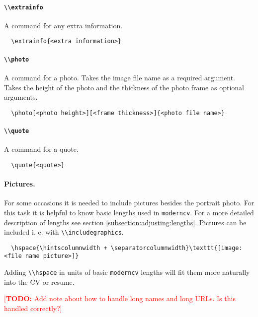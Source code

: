 \documentclass[a4paper, 11pt]{article}
\newcommand{\todox}[1]{\textcolor{red}{[\textbf{TODO:} #1]}}
\newcommand{\code}[1]{\lstinline!#1!}
\newcommand{\moderncv}{\code{moderncv}}
\begin{document}
\paragraph{\code{\\extrainfo}}
A command for any extra information.
\begin{lstlisting}
  \extrainfo{<extra information>}
\end{lstlisting}

\paragraph{\code{\\photo}}
A command for a photo.
Takes the image file name as a required argument.
Takes the height of the photo and the thickness of the photo frame as optional arguments.
\begin{lstlisting}
  \photo[<photo height>][<frame thickness>]{<photo file name>}
\end{lstlisting}

\paragraph{\code{\\quote}}
A command for a quote.
\begin{lstlisting}
  \quote{<quote>}
\end{lstlisting}

\paragraph{Pictures.}
For some occasions it is needed to include pictures besides the portrait photo. For this task it is helpful to know basic lengths used in \moderncv. For a more detailed description of lengths see section \ref{subsection:adjusting:lengths}.
Pictures can be included i. e. with \code{\\includegraphics}.
\begin{lstlisting}
  \hspace{\hintscolumnwidth + \separatorcolumnwidth}\texttt{[image: <file name picture>]}
\end{lstlisting}
Adding \code{\\hspace} in units of basic \code{moderncv} lengths will fit them more naturally into the CV or resume.  

\todox{Add note about how to handle long names and long URLs. Is this handled correctly?}
\end{document}

